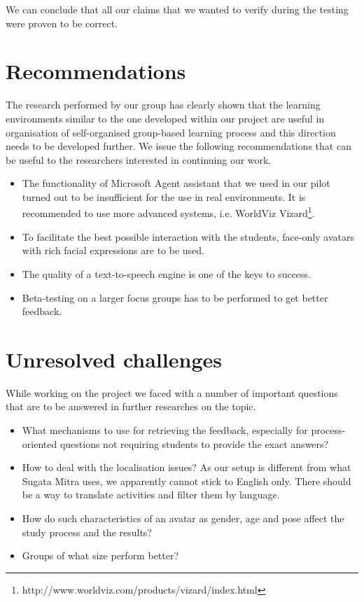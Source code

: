 \documentclass[a4paper]{article}
\begin{document}
We can conclude that all our claims that we wanted to verify during the testing were proven to be correct.

\section{Recommendations}

The research performed by our group has clearly shown that the learning environments similar to the one developed within our project are useful in organisation of self-organised group-based learning process and this direction needs to be developed further. We issue the following recommendations that can be useful to the researchers interested in continuing our work.

\begin{itemize}
	\item The functionality of Microsoft Agent assistant that we used in our pilot turned out to be insufficient for the use in real environments. It is recommended to use more advanced systems, i.e. WorldViz Vizard\footnote{http://www.worldviz.com/products/vizard/index.html}.
	\item To facilitate the best possible interaction with the students, face-only avatars with rich facial expressions are to be used.
	\item The quality of a text-to-speech engine is one of the keys to success.
	\item Beta-testing on a larger focus groups has to be performed to get better feedback.  
\end{itemize}

\section{Unresolved challenges}

While working on the project we faced with a number of important questions that are to be answered in further researches on the topic.

\begin{itemize}
	\item What mechanisms to use for retrieving the feedback, especially for process-oriented questions not requiring students to provide the exact answers?
	\item How to deal with the localisation issues? As our setup is different from what Sugata Mitra uses, we apparently cannot stick to English only. There should be a way to translate activities and filter them by language.
	\item How do such characteristics of an avatar as gender, age and pose affect the study process and the results?
	\item Groups of what size perform better?
\end{itemize}
\end{document}
